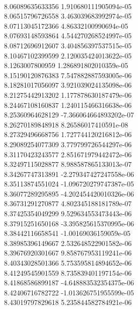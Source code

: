 { \\
8.06089635633356 1.910680111905094e-05
 \\
8.06515796726558 3.463039683992974e-05
 \\
8.07113045172366 4.86332100990694e-05
 \\
8.07693148593864 4.544270268524997e-05
 \\
8.08712696912607 3.404856397537515e-05
 \\
8.10467102399599 2.120035424013622e-05
 \\
8.1263007800959 1.286891802010359e-05
 \\
8.15190120876383 7.547882887593005e-06
 \\
8.18281017056097 3.921039024135098e-06
 \\
8.21275442913202 1.177878630187479e-06
 \\
8.24467108160837 1.240115466316638e-06
 \\
8.25360964628129 -7.366064664893202e-07
 \\
8.26270189848918 8.26586017410591e-08
 \\
8.27329496668756 1.727744120216812e-06
 \\
8.29089254077309 3.779799726544297e-06
 \\
8.31170423243577 2.851671979442472e-06
 \\
8.32497115028877 8.988587865133013e-07
 \\
8.34267747313891 -2.279347427247558e-06
 \\
8.35113874551024 -1.096720279747387e-05
 \\
8.36077289295895 -4.202454420010326e-06
 \\
8.36731291270877 4.802345188181789e-07
 \\
8.37425354049299 9.529634553473443e-06
 \\
8.37915251650168 -3.395825615370995e-06
 \\
8.38442116658541 -1.00169036159059e-05
 \\
8.38985396149667 2.532648522901582e-06
 \\
8.39676920301667 9.858767953119241e-06
 \\
8.40343028501366 5.753595814894652e-06
 \\
8.41249545901559 8.735839401197154e-06
 \\
8.41868586899187 -4.648883532354375e-06
 \\
8.42406716782722 -1.013626751955599e-05
 \\
8.43019797829618 5.235844582784921e-06
 \\
}
